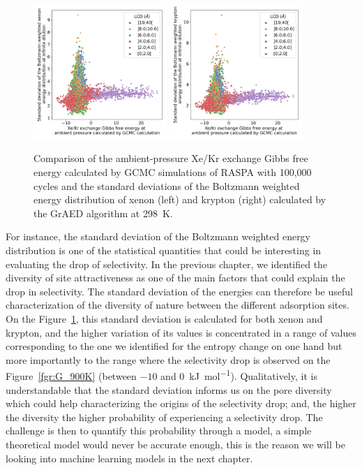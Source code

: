 \documentclass[main]{subfiles}
\begin{document}
\begin{figure}[ht]
  \centering
    \includegraphics[width=0.45\textwidth]{figures/3-fastsim/G_2080_vs_enthalpy_std_x_overview.jpg}
    \includegraphics[width=0.45\textwidth]{figures/3-fastsim/G_2080_vs_enthalpy_std_y_overview.jpg}
        \caption{Comparison of the ambient-pressure Xe/Kr exchange Gibbs free energy calculated by GCMC simulations of RASPA with 100,000 cycles and the standard deviations of the Boltzmann weighted energy distribution of xenon (left) and krypton (right) calculated by the GrAED algorithm at \SI{298}{\kelvin}.}\label{fgr:enthalpy_std}
\end{figure}

For instance, the standard deviation of the Boltzmann weighted energy distribution is one of the statistical quantities that could be interesting in evaluating the drop of selectivity. In the previous chapter, we identified the diversity of site attractiveness as one of the main factors that could explain the drop in selectivity. The standard deviation of the energies can therefore be useful characterization of the diversity of nature between the different adsorption sites. On the Figure~\ref{fgr:enthalpy_std}, this standard deviation is calculated for both xenon and krypton, and the higher variation of its values is concentrated in a range of values corresponding to the one we identified for the entropy change on one hand but more importantly to the range where the selectivity drop is observed on the Figure~\ref{fgr:G_900K} (between $-10$ and $0$~\si{\kilo\joule\per\mole}). Qualitatively, it is understandable that the standard deviation informs us on the pore diversity which could help characterizing the origins of the selectivity drop; and, the higher the diversity the higher probability of experiencing a selectivity drop. The challenge is then to quantify this probability through a model, a simple theoretical model would never be accurate enough, this is the reason we will be looking into machine learning models in the next chapter.
\end{document}
